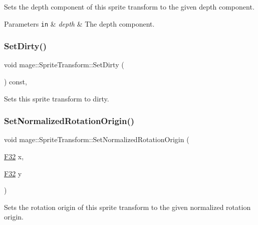 Sets the depth component of this sprite transform to the given depth component.


\begin{DoxyParams}[1]{Parameters}
\mbox{\tt in}  & {\em depth} & The depth component. \\
\hline
\end{DoxyParams}
\hypertarget{structmage_1_1_sprite_transform_ab76e0ca7d8f4e37a8a6f58a7a9face17}{}\label{structmage_1_1_sprite_transform_ab76e0ca7d8f4e37a8a6f58a7a9face17} 
\subsubsection{\texorpdfstring{Set\+Dirty()}{SetDirty()}}
{\footnotesize\ttfamily void mage\+::\+Sprite\+Transform\+::\+Set\+Dirty (\begin{DoxyParamCaption}{ }\end{DoxyParamCaption}) const\hspace{0.3cm}{\ttfamily [private]}, {\ttfamily [noexcept]}}

Sets this sprite transform to dirty. \hypertarget{structmage_1_1_sprite_transform_aeab79024ac1941d9865a202258238dfe}{}\label{structmage_1_1_sprite_transform_aeab79024ac1941d9865a202258238dfe} 
\subsubsection{\texorpdfstring{Set\+Normalized\+Rotation\+Origin()}{SetNormalizedRotationOrigin()}\hspace{0.1cm}{\footnotesize\ttfamily [1/3]}}
{\footnotesize\ttfamily void mage\+::\+Sprite\+Transform\+::\+Set\+Normalized\+Rotation\+Origin (\begin{DoxyParamCaption}\item[{\hyperlink{namespacemage_aa97e833b45f06d60a0a9c4fc22ae02c0}{F32}}]{x,  }\item[{\hyperlink{namespacemage_aa97e833b45f06d60a0a9c4fc22ae02c0}{F32}}]{y }\end{DoxyParamCaption})}

Sets the rotation origin of this sprite transform to the given normalized rotation origin.

